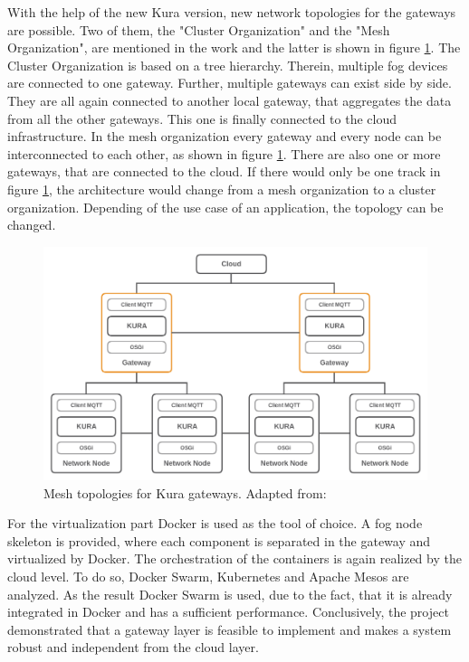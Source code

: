 With the help of the new Kura version, new network topologies for the gateways are possible.
Two of them, the "Cluster Organization" and the "Mesh Organization", are mentioned in the work and the latter is shown in figure \ref{fig:kura_gateway_topologies}.\autocite[cf.][p. 4]{Bellavista:2017}
The Cluster Organization is based on a tree hierarchy.
Therein, multiple fog devices are connected to one gateway.
Further, multiple gateways can exist side by side.
They are all again connected to another local gateway, that aggregates the data from all the other gateways.
This one is finally connected to the cloud infrastructure.
In the mesh organization every gateway and every node can be interconnected to each other, as shown in figure \ref{fig:kura_gateway_topologies}.
There are also one or more gateways, that are connected to the cloud.
If there would only be one track in figure \ref{fig:kura_gateway_topologies}, the architecture would change from a mesh organization to a cluster organization.
Depending of the use case of an application, the topology can be changed.

\begin{figure}[H]
    \centering
    \includegraphics[width=\textwidth]{resources/images/kura_topologies.png}
    \caption[Mesh topologies for Kura gateways]{Mesh topologies for Kura gateways. Adapted from: \autocite[p. 4]{Bellavista:2017}}
    \label{fig:kura_gateway_topologies}
\end{figure}

For the virtualization part \autocite{Bellavista:2017} Docker is used as the tool of choice.
A fog node skeleton is provided, where each component is separated in the gateway and virtualized by Docker.\autocite[cf.][p. 6]{Bellavista:2017}
The orchestration of the containers is again realized by the cloud level.
To do so, Docker Swarm, Kubernetes and Apache Mesos are analyzed.\autocite[cf.][p. 6 f.]{Bellavista:2017}
As the result Docker Swarm is used, due to the fact, that it is already integrated in Docker and has a sufficient performance.\autocite[cf.][p. 7]{Bellavista:2017}
Conclusively, the project demonstrated that a gateway layer is feasible to implement and makes a system robust and independent from the cloud layer.

